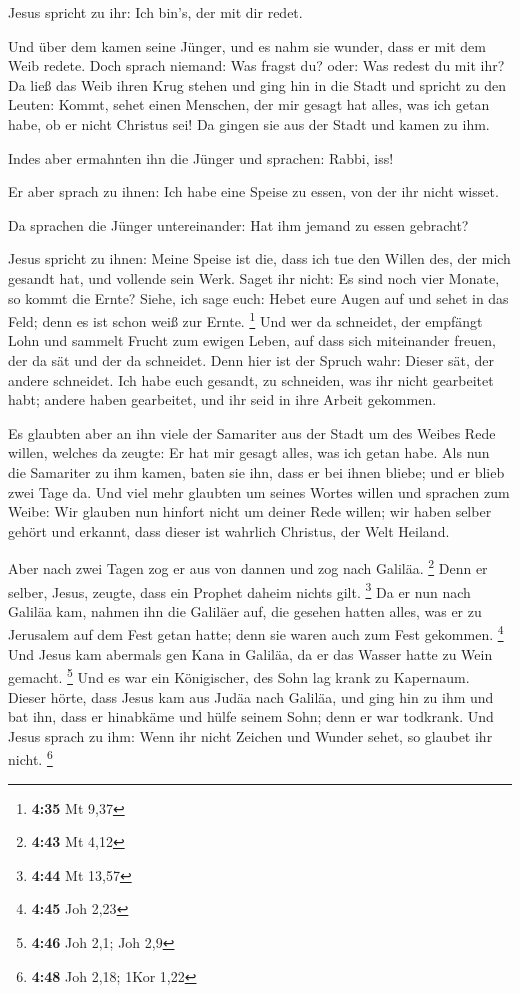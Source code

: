  Jesus spricht zu ihr: Ich bin's, der mit dir redet.

 Und über dem kamen seine Jünger, und es nahm sie wunder,
dass er mit dem Weib redete. Doch sprach niemand: Was fragst du? oder:
Was redest du mit ihr?  Da ließ das Weib ihren Krug
stehen und ging hin in die Stadt und spricht zu den Leuten:
 Kommt, sehet einen Menschen, der mir gesagt hat alles,
was ich getan habe, ob er nicht Christus sei!  Da gingen
sie aus der Stadt und kamen zu ihm.

 Indes aber ermahnten ihn die Jünger und sprachen: Rabbi,
iss!

 Er aber sprach zu ihnen: Ich habe eine Speise zu essen,
von der ihr nicht wisset.

 Da sprachen die Jünger untereinander: Hat ihm jemand zu
essen gebracht?

 Jesus spricht zu ihnen: Meine Speise ist die, dass ich
tue den Willen des, der mich gesandt hat, und vollende sein Werk.
 Saget ihr nicht: Es sind noch vier Monate, so kommt die
Ernte? Siehe, ich sage euch: Hebet eure Augen auf und sehet in das Feld;
denn es ist schon weiß zur Ernte. \footnote{\textbf{4:35} Mt 9,37}
 Und wer da schneidet, der empfängt Lohn und sammelt
Frucht zum ewigen Leben, auf dass sich miteinander freuen, der da sät
und der da schneidet.  Denn hier ist der Spruch wahr:
Dieser sät, der andere schneidet.  Ich habe euch gesandt,
zu schneiden, was ihr nicht gearbeitet habt; andere haben gearbeitet,
und ihr seid in ihre Arbeit gekommen.

 Es glaubten aber an ihn viele der Samariter aus der
Stadt um des Weibes Rede willen, welches da zeugte: Er hat mir gesagt
alles, was ich getan habe.  Als nun die Samariter zu ihm
kamen, baten sie ihn, dass er bei ihnen bliebe; und er blieb zwei Tage
da.  Und viel mehr glaubten um seines Wortes willen
 und sprachen zum Weibe: Wir glauben nun hinfort nicht um
deiner Rede willen; wir haben selber gehört und erkannt, dass dieser ist
wahrlich Christus, der Welt Heiland.

 Aber nach zwei Tagen zog er aus von dannen und zog nach
Galiläa. \footnote{\textbf{4:43} Mt 4,12}  Denn er
selber, Jesus, zeugte, dass ein Prophet daheim nichts gilt. \footnote{\textbf{4:44}
  Mt 13,57}  Da er nun nach Galiläa kam, nahmen ihn die
Galiläer auf, die gesehen hatten alles, was er zu Jerusalem auf dem Fest
getan hatte; denn sie waren auch zum Fest gekommen. \footnote{\textbf{4:45}
  Joh 2,23}  Und Jesus kam abermals gen Kana in Galiläa,
da er das Wasser hatte zu Wein gemacht. \footnote{\textbf{4:46} Joh 2,1;
  Joh 2,9}  Und es war ein Königischer, des Sohn lag
krank zu Kapernaum. Dieser hörte, dass Jesus kam aus Judäa nach Galiläa,
und ging hin zu ihm und bat ihn, dass er hinabkäme und hülfe seinem
Sohn; denn er war todkrank.  Und Jesus sprach zu ihm:
Wenn ihr nicht Zeichen und Wunder sehet, so glaubet ihr nicht.
\footnote{\textbf{4:48} Joh 2,18; 1Kor 1,22}

